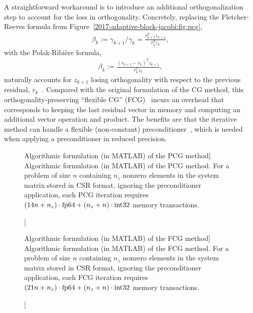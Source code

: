 A straightforward workaround is to introduce an additional orthogonalization
step to account for the loss in orthogonality. Concretely, replacing the
Fletcher-Reeves formula from Figure~\ref{2017-adaptive-block-jacobi:fig:pcg},
\begin{align}
\beta_{k}:=\gamma_{k+1}/\gamma_{k}=\frac{r_{k+1}^T z_{k+1}}{r_{k}^T z_{k}},
\label{2017-adaptive-block-jacobi:eq:fr}
\end{align}
with the Polak-Ribi\`{e}re formula,
\begin{align}
\beta_{k}:=\frac{(r_{k+1}-r_k)^T z_{k+1}}{r_{k}^T z_{k}},
\label{2017-adaptive-block-jacobi:eq:pr}
\end{align}
naturally accounts for $z_{k+1}$ losing orthogonality with respect to the
previous residual, $r_k$~\cite{doi:10.1137/S1064827597323415}. Compared
with the original formulation of the CG method, this
orthogonality-preserving ``flexible CG''
(FCG)~\cite{doi:10.1137/S1064827597323415} incurs an overhead that
corresponds to keeping the last residual vector in memory and computing an
additional vector operation and \dotp product. The benefits are that the
iterative method can handle a flexible (non-constant)
preconditioner~\cite{notay}, which is needed when applying a preconditioner in
reduced precision.

\begin{figure}[t]
\begin{center}
\begin{minipage}{\columnwidth}
{\small

}
\end{minipage}
\caption
[Algorithmic formulation (in MATLAB) of the PCG method]
{Algorithmic formulation (in MATLAB) of the PCG method.
For a problem of size $n$ containing $n_z$ nonzero elements in the system matrix
stored in CSR format, ignoring the preconditioner application, each PCG
iteration requires $(14n+n_z)\cdot\mbox{\rm fp64}+(n_z+n)\cdot\mbox{\rm int32}$ memory transactions.}
\label{2017-adaptive-block-jacobi:fig:codepcg}
\end{center}
\end{figure}

\begin{figure}[t]
\begin{center}
\begin{minipage}{\columnwidth}
{\small

}
\end{minipage}
\caption
[Algorithmic formulation (in MATLAB) of the FCG method]
{Algorithmic formulation (in MATLAB) of the FCG method.
For a problem of size $n$ containing $n_z$ nonzero elements in the system matrix
stored in CSR format, ignoring the preconditioner application, each FCG
iteration requires $(21n+n_z)\cdot\mbox{\rm fp64}+(n_z+n)\cdot\mbox{\rm int32}$ memory transactions.}
\label{2017-adaptive-block-jacobi:fig:codefcg}
\end{center}
\end{figure}


